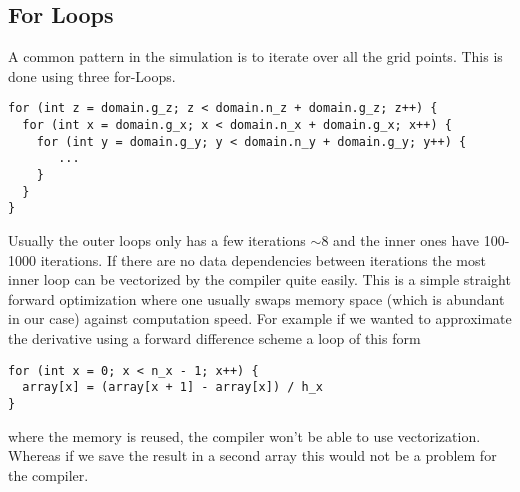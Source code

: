 \documentclass[master.tex]{subfiles}
\begin{document}
\subsection{For Loops}
A common pattern in the simulation is to iterate over all the grid points.
This is done using three for-Loops.
\begin{lstlisting}
for (int z = domain.g_z; z < domain.n_z + domain.g_z; z++) {
  for (int x = domain.g_x; x < domain.n_x + domain.g_x; x++) {
    for (int y = domain.g_y; y < domain.n_y + domain.g_y; y++) {
       ...
    }
  }
}
\end{lstlisting}
Usually the outer loops only has a few iterations $\sim 8$ and the inner ones have 100-1000 iterations.
If there are no data dependencies between iterations the most inner loop can be vectorized by the compiler quite easily. This is a simple straight forward optimization where one usually swaps memory space (which is abundant in our case) against computation speed. For example if we wanted to approximate the derivative using a forward difference scheme a loop of this form
\begin{lstlisting}
for (int x = 0; x < n_x - 1; x++) {
  array[x] = (array[x + 1] - array[x]) / h_x    
}
\end{lstlisting}
where the memory is reused, the compiler won't be able to use vectorization. Whereas if we save the result in a second array this would not be a problem for the compiler.
\end{document}
